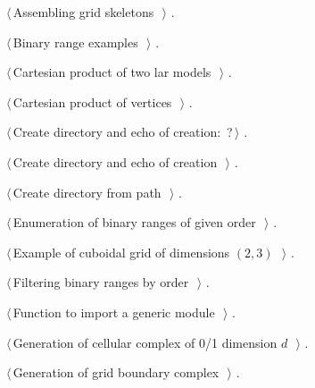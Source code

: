 \documentclass[11pt,oneside]{article}	%
\begin{document}
{\small\begin{list}{}{\setlength{\itemsep}{-\parsep}\setlength{\itemindent}{-\leftmargin}}
\item $\langle\,$Assembling grid skeletons\nobreak\ {\footnotesize {}}$\,\rangle$ {\footnotesize {\NWtxtRefIn} .}
\item $\langle\,$Binary range examples\nobreak\ {\footnotesize {}}$\,\rangle$ {\footnotesize {\NWtxtNoRef}.}
\item $\langle\,$Cartesian product of two lar models\nobreak\ {\footnotesize {}}$\,\rangle$ {\footnotesize {\NWtxtRefIn} .}
\item $\langle\,$Cartesian product of vertices\nobreak\ {\footnotesize {}}$\,\rangle$ {\footnotesize {\NWtxtRefIn} .}
\item $\langle\,$Create directory and echo of creation:\nobreak\ {\footnotesize ?}$\,\rangle$ {\footnotesize {\NWtxtRefIn} .}
\item $\langle\,$Create directory and echo of creation\nobreak\ {\footnotesize {}}$\,\rangle$ {\footnotesize {\NWtxtNoRef}.}
\item $\langle\,$Create directory from path\nobreak\ {\footnotesize {}}$\,\rangle$ {\footnotesize {\NWtxtRefIn} .
}
\item $\langle\,$Enumeration of binary ranges of given order\nobreak\ {\footnotesize {}}$\,\rangle$ {\footnotesize {\NWtxtRefIn} .}
\item $\langle\,$Example of cuboidal grid of dimensions $(2,3)$\nobreak\ {\footnotesize {}}$\,\rangle$ {\footnotesize {\NWtxtNoRef}.}
\item $\langle\,$Filtering binary ranges by order\nobreak\ {\footnotesize {}}$\,\rangle$ {\footnotesize {\NWtxtRefIn} .}
\item $\langle\,$Function to import a generic module\nobreak\ {\footnotesize {}}$\,\rangle$ {\footnotesize {\NWtxtNoRef}.}
\item $\langle\,$Generation of cellular complex of 0/1 dimension $d$\nobreak\ {\footnotesize {}}$\,\rangle$ {\footnotesize {\NWtxtRefIn} .}
\item $\langle\,$Generation of grid boundary complex\nobreak\ {\footnotesize {}}$\,\rangle$ {\footnotesize {\NWtxtRefIn} .}

\end{list}}
\end{document}
